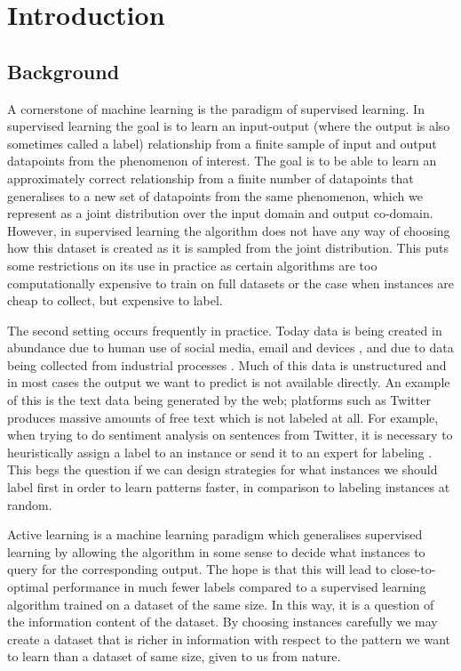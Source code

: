 \chapter{Introduction}
\label{ch:introduction}

\section{Background}
\label{sec:background}
A cornerstone of machine learning is the paradigm of supervised learning. In
supervised learning the goal is to learn an input-output (where the output is
also sometimes called a label) relationship from a finite sample of input and
output datapoints from the phenomenon of interest. The goal is to be able to
learn an approximately correct relationship from a finite number of datapoints
that generalises to a new set of datapoints from the same phenomenon, which we
represent as a joint distribution over the input domain and output co-domain.
However, in supervised learning the algorithm does not have any way of choosing
how this dataset is created as it is sampled from the joint distribution. This
puts some restrictions on its use in practice as certain algorithms are too
computationally expensive to train on full datasets or the case when instances
are cheap to collect, but expensive to label.

The second setting occurs frequently in practice. Today data is being created in
abundance due to human use of social media, email and devices
\cite{desjardins19_how}, and due to data being collected from industrial processes
\cite{qin14_proces_data_analy_era_big_data}. Much of this data is unstructured and
in most cases the output we want to predict is not available directly. An
example of this is the text data being generated by the web; platforms such as
Twitter produces massive amounts of free text which is not labeled at all. For
example, when trying to do sentiment analysis on sentences from Twitter, it is
necessary to heuristically assign a label to an instance or send it to an expert
for labeling \cite{pak10_twitt}. This begs the question if we can design
strategies for what instances we should label first in order to learn patterns
faster, in comparison to labeling instances at random.

Active learning \cite{cohn94_improv_gener_with_activ_learn} is a machine learning
paradigm which generalises supervised learning by allowing the algorithm in some
sense to decide what instances to query for the corresponding output. The hope
is that this will lead to close-to-optimal performance in much fewer labels
compared to a supervised learning algorithm trained on a dataset of the same
size. In this way, it is a question of the information content of the dataset.
By choosing instances carefully we may create a dataset that is richer in
information with respect to the pattern we want to learn than a dataset of same
size, given to us from nature.

